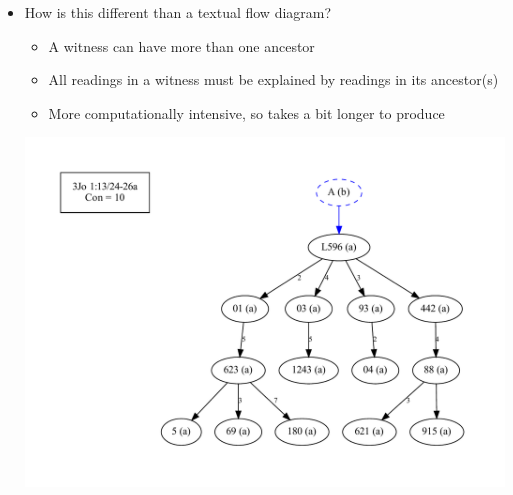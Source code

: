 \documentclass[10pt]{beamer}
\begin{document}
	\begin{frame}
		\begin{itemize}
			\item How is this different than a textual flow diagram?
			\begin{itemize}
				\item A witness can have more than one ancestor
				\item All readings in a witness must be explained by readings in its ancestor(s)
				\item More computationally intensive, so takes a bit longer to produce
			\end{itemize}
			\begin{center}
				\includegraphics[scale=0.3333]{../img/B25K1V13U24-26Ra-coherence-attestations-b-initial.pdf}
				\hfill
			\end{center}
		\end{itemize}
	\end{frame}
\end{document}
